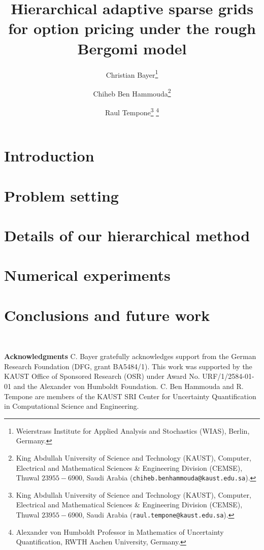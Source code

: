 \documentclass[11pt]{article}
\title{Hierarchical adaptive sparse  grids for option pricing under the rough Bergomi model}
\author{Christian Bayer\thanks{
 Weierstrass Institute for Applied Analysis and Stochastics (WIAS),
 Berlin, Germany.}
        \and Chiheb Ben Hammouda\thanks{King Abdullah University of Science and Technology (KAUST), Computer, Electrical and Mathematical Sciences \& Engineering Division (CEMSE), Thuwal $23955-6900$, Saudi Arabia ({\tt chiheb.benhammouda@kaust.edu.sa}).} 
\and  Raul Tempone\thanks{King Abdullah University of Science and Technology (KAUST), Computer, Electrical and Mathematical Sciences \& Engineering Division (CEMSE), Thuwal $23955-6900$, Saudi Arabia ({\tt raul.tempone@kaust.edu.sa}).} \thanks{Alexander von Humboldt Professor in Mathematics of Uncertainty Quantification, RWTH Aachen University, Germany.}}
\begin{document}
\maketitle

\begin{abstract}
	  
\end{abstract}






\thispagestyle{plain}

\setcounter{tocdepth}{1}


 \section{Introduction}




 \section{Problem setting}\label{sec:Problem setting}




\section{Details of our hierarchical method}\label{sec:Details our approach and error bounds}




%

  \section{Numerical experiments}\label{sec:Numerical tests}




\section{Conclusions and future work}



\

\textbf{Acknowledgments} C. Bayer gratefully acknowledges support from the German Research Foundation (DFG, grant BA5484/1). This work was supported by the KAUST Office of Sponsored Research (OSR) under Award No. URF/1/2584-01-01 and the Alexander von Humboldt Foundation. C. Ben Hammouda and R. Tempone are members of the KAUST SRI Center for Uncertainty Quantification in Computational Science and Engineering. 





 




%






 

 

 
 
 
\end{document}
